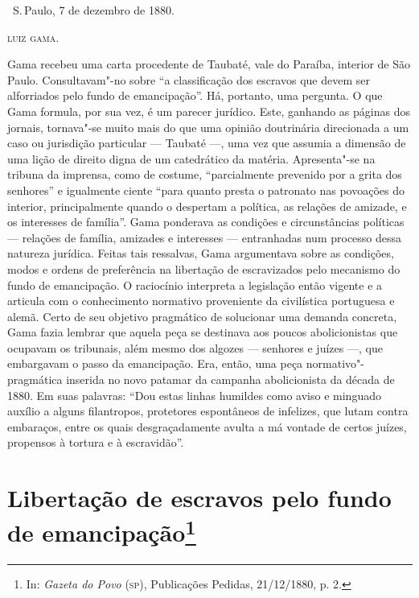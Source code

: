 \bigskip

\hfill\ S.\,Paulo, 7 de dezembro de 1880.\smallskip

\hfill\textsc{luiz gama}.

\pagebreak
\mbox{}\vfill
\thispagestyle{empty}

{\small\noindent
Gama recebeu uma carta procedente de Taubaté, vale do Paraíba,
interior de São Paulo. Consultavam"-no sobre ``a classificação dos
escravos que devem ser alforriados pelo fundo de emancipação''. Há,
portanto, uma pergunta. O que Gama formula, por sua vez, é um parecer
jurídico. Este, ganhando as páginas dos jornais, tornava"-se muito mais
do que uma opinião doutrinária direcionada a um caso ou jurisdição
particular --- Taubaté ---, uma vez que assumia a dimensão de uma lição de
direito digna de um catedrático da matéria. Apresenta"-se na tribuna da
imprensa, como de costume, ``parcialmente prevenido por a grita dos
senhores'' e igualmente ciente ``para quanto presta o patronato nas
povoações do interior, principalmente quando o despertam a política, as
relações de amizade, e os interesses de família''. Gama ponderava as
condições e circunstâncias políticas --- relações de
família, amizades e interesses --- entranhadas num processo dessa
natureza jurídica. Feitas tais ressalvas, Gama argumentava sobre as condições, modos
e ordens de preferência na libertação de escravizados pelo mecanismo do
fundo de emancipação. O raciocínio interpreta a legislação então vigente
e a articula com o conhecimento normativo proveniente da civilística portuguesa e alemã.
Certo de seu objetivo pragmático de solucionar uma demanda concreta,
Gama fazia lembrar que aquela peça se destinava aos poucos abolicionistas que
ocupavam os tribunais, além mesmo dos algozes --- senhores e juízes ---,
que embargavam o passo da emancipação. Era, então, uma peça
normativo"-pragmática inserida no novo patamar da campanha abolicionista
da década de 1880. Em suas palavras: ``Dou estas linhas humildes como
aviso e minguado auxílio a alguns filantropos, protetores espontâneos de
infelizes, que lutam contra embaraços, entre os quais desgraçadamente
avulta a má vontade de certos juízes, propensos à tortura e à
escravidão''.}

\chapter{Libertação de escravos pelo fundo de emancipação\footnote[*]{
  In: \emph{Gazeta do Povo} (\textsc{sp}), Publicações Pedidas, 21/12/1880, p. 2.}}

